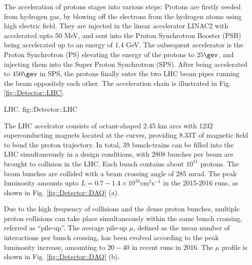 % 


The acceleration of protons stages into various steps: 
Protons are firstly seeded from hydrogen gas, by blowing off the electrons from the hydrogen atoms using high electric field.
They are injected in the linear accelerator LINAC2 with accelerated upto 50 MeV, and sent into the Proton Synchrotron Booster (PSB) being accelerated up to an energy of 1.4 GeV. 
The subsequent accelerator is the Proton Synchrotron (PS) elevating the energy of the protons to $25\gev$, and injecting them into the Super Proton Synchrotron (SPS). After being accelerated to $450\gev$ in SPS, the protons finally enter the two LHC beam pipes running the beam oppositely each other. The acceleration chain is illustrated in Fig. \ref{fig::Detector::LHC}.

{LHC. \cite{LHCPhoto}}
{fig::Detector::LHC}


The LHC accelrator consists of octant-shaped 2.45 km arcs with 1232 superconducting magnets located at the curves, providing 8.33T of magnetic field to bend the proton trajectory.
In total, 39 bunch-trains can be filled into the LHC simultaneously in a design conditions, with 2808 bunches per beam are brought to collision in the LHC. Each bunch contains about $10^{11}$ protons. 
The beam bunches are collided with a beam crossing angle of 285 mrad. 
The peak luminosity amounts upto $L = 0.7-1.4 \times 10^{34} \mathrm{cm}^{2} \mathrm{s}^{-1}$ in the 2015-2016 runs, as shown in Fig. \ref{fig::Detector::DAQ} (a).

Due to the high frequency of collisions and the dense proton bunches, multiple proton collisions can take place simultaneously within the same bunch crossing, referred as ``pile-up''. 
The average pile-up $\mu$, defined as the mean number of interactions per bunch crossing,  
has been evolved according to the peak luminosity increase, amounting to $20-40$ in recent runs in 2016. The $\mu$ profile is shown in Fig. \ref{fig::Detector::DAQ} (b).

